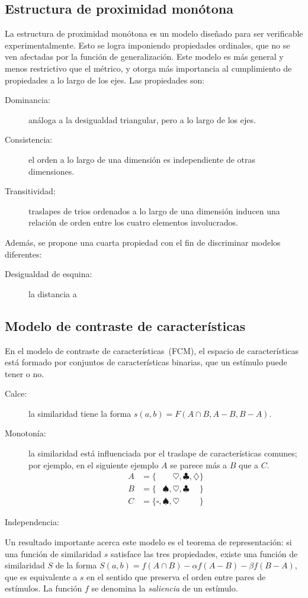 \documentclass[spanish]{article}
\newcommand{\SMA}{\square}
\newcommand{\SMB}{\spadesuit}
\newcommand{\SMC}{\heartsuit}
\newcommand{\SMD}{\clubsuit}
\newcommand{\SME}{\diamondsuit}
\begin{document}
\subsection{Estructura de proximidad monótona}
La estructura de proximidad monótona es un modelo diseñado para ser verificable experimentalmente.
Esto se logra imponiendo propiedades ordinales, que no se ven afectadas por la función de
generalización.  Este modelo es más general y menos restrictivo que el métrico, y otorga
más importancia al cumplimiento de propiedades a lo largo de los ejes.  Las propiedades son:
\begin{description}
    \item [Dominancia:]
        análoga a la desigualdad triangular, pero a lo largo de los ejes.
    \item [Consistencia:]
        el orden a lo largo de una dimensión es independiente de otras
        dimensiones.
    \item [Transitividad:]
        traslapes de trios ordenados a lo largo de una dimensión inducen una
        relación de orden entre los cuatro elementos involucrados.
\end{description}
Además, se propone una cuarta propiedad con el fin de discriminar modelos
diferentes:
\begin{description}
    \item [Desigualdad de esquina:] la distancia a 
\end{description}



\subsection{Modelo de contraste de características}
En el modelo de contraste de características~(FCM), el espacio de características está formado por
conjuntos de características binarias, que un estímulo puede tener o no.
\begin{description}
    \item [Calce:] la similaridad tiene la forma $s(a, b) = F(A\cap B, A-B, B-A)$.
    \item [Monotonía:] la similaridad está influenciada por el traslape de características comunes;
        por ejemplo, en el siguiente ejemplo $A$ se parece más a $B$ que a $C$.
        \begin{align*}
            A &= \{\phantom{\SMA,  \SMB,} \SMC,          \SMD,          \SME\}  \\
            B &= \{\phantom{\SMA,} \SMB,  \SMC,          \SMD\phantom{, \SME}\} \\
            C &=          \{\SMA,  \SMB,  \SMC\phantom{, \SMD,          \SME}\}
        \end{align*}
    \item [Independencia:] 
\end{description}
Un resultado importante acerca este modelo es el teorema de representación: si una función de
similaridad $s$ satisface las tres propiedades, existe una función de similaridad $S$ de la forma
$S(a, b) = f(A\cap B) - \alpha f(A-B) - \beta f(B-A)$, que es equivalente a $s$ en el sentido que
preserva el orden entre pares de estímulos.  La función $f$ se denomina la \emph{saliencia} de un
estímulo.
\end{document}
